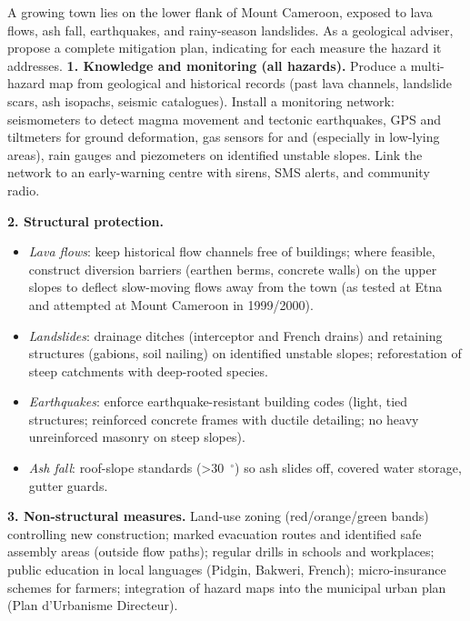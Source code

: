 \documentclass[11pt]{article}
\begin{document}
\begin{exoresolu}
A growing town lies on the lower flank of Mount Cameroon, exposed to lava flows, ash fall, earthquakes, and rainy-season landslides. As a geological adviser, propose a complete mitigation plan, indicating for each measure the hazard it addresses.
\tcblower
\textbf{1. Knowledge and monitoring (all hazards).} Produce a multi-hazard map from geological and historical records (past lava channels, landslide scars, ash isopachs, seismic catalogues). Install a monitoring network: seismometers to detect magma movement and tectonic earthquakes, GPS and tiltmeters for ground deformation, gas sensors for  and  (especially in low-lying areas), rain gauges and piezometers on identified unstable slopes. Link the network to an early-warning centre with sirens, SMS alerts, and community radio.

\textbf{2. Structural protection.}
\begin{itemize}
\item \emph{Lava flows}: keep historical flow channels free of buildings; where feasible, construct diversion barriers (earthen berms, concrete walls) on the upper slopes to deflect slow-moving flows away from the town (as tested at Etna and attempted at Mount Cameroon in 1999/2000).
\item \emph{Landslides}: drainage ditches (interceptor and French drains) and retaining structures (gabions, soil nailing) on identified unstable slopes; reforestation of steep catchments with deep-rooted species.
\item \emph{Earthquakes}: enforce earthquake-resistant building codes (light, tied structures; reinforced concrete frames with ductile detailing; no heavy unreinforced masonry on steep slopes).
\item \emph{Ash fall}: roof-slope standards (\SI{>30}{\ensuremath{{}^{\circ}}}) so ash slides off, covered water storage, gutter guards.
\end{itemize}

\textbf{3. Non-structural measures.} Land-use zoning (red/orange/green bands) controlling new construction; marked evacuation routes and identified safe assembly areas (outside flow paths); regular drills in schools and workplaces; public education in local languages (Pidgin, Bakweri, French); micro-insurance schemes for farmers; integration of hazard maps into the municipal urban plan (Plan d'Urbanisme Directeur).


\end{exoresolu}
\end{document}
